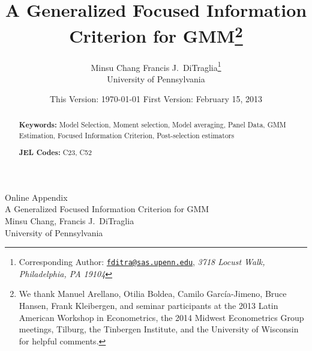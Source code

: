 \documentclass[12pt]{article}
\begin{document}
\title{A Generalized Focused Information Criterion for GMM\footnote{We thank Manuel Arellano, Otilia Boldea, Camilo Garc\'{i}a-Jimeno, Bruce Hansen, Frank Kleibergen, and seminar participants at the 2013 Latin American Workshop in Econometrics, the 2014 Midwest Econometrics Group meetings, Tilburg, the Tinbergen Institute, and the University of Wisconsin for helpful comments.}} 

\author{Minsu Chang \hspace{1em} Francis J.\ DiTraglia\footnote{Corresponding Author:
\href{mailto:fditra@sas.upenn.edu}{\texttt{fditra@sas.upenn.edu}}, \emph{3718 Locust Walk, Philadelphia, PA 19104}}
\\ University of Pennsylvania}

\date{\footnotesize This Version: \today \hspace{0.5em} First Version: February 15, 2013}

\maketitle 
\begin{abstract}
  \singlespacing
	

	\bigskip
	\noindent\textbf{Keywords:} 
  Model Selection, Moment selection, Model averaging, Panel Data, GMM Estimation, Focused Information Criterion, Post-selection estimators

	\medskip
	\noindent\textbf{JEL Codes:} C23, C52 
\end{abstract}










\singlespacing
\small



\appendix


\newpage

\clearpage
\normalsize
{}
\begin{center}
  {\Huge Online Appendix\\}
  \vspace{1em}
  {\Large A Generalized Focused Information Criterion for GMM\\}
  \vspace{2em}
  {\large Minsu Chang, Francis J.\ DiTraglia\\ University of Pennsylvania}
\end{center}

\renewcommand*{\thepage}{Online Appendix - \arabic{page}}
\normalsize


\newpage


\end{document}
